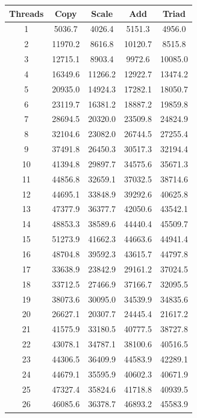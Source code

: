 \documentclass[12pt,a4paper,USenglish]{article}      %
\begin{document}
\begin{table}[!hbtp]
\begin{tabular}{ |c|c|c|c|c| } 
\hline
Threads & Copy & Scale & Add & Triad \\
\hline
1 & 5036.7 & 4026.4 & 5151.3 & 4956.0 \\
\hline
2 & 11970.2 & 8616.8 & 10120.7 & 8515.8 \\
\hline
3 & 12715.1 & 8903.4 & 9972.6 & 10085.0 \\
\hline
4 & 16349.6 & 11266.2 & 12922.7 & 13474.2 \\
\hline
5 & 20935.0 & 14924.3 & 17282.1 & 18050.7 \\
\hline
6 & 23119.7 & 16381.2 & 18887.2 & 19859.8 \\
\hline
7 & 28694.5 & 20320.0 & 23509.8 & 24824.9 \\
\hline
8 & 32104.6 & 23082.0 & 26744.5 & 27255.4 \\
\hline
9 & 37491.8 & 26450.3 & 30517.3 & 32194.4 \\
\hline
10 & 41394.8 & 29897.7 & 34575.6 & 35671.3 \\
\hline
11 & 44856.8 & 32659.1 & 37032.5 & 38714.6 \\
\hline
12 & 44695.1 & 33848.9 & 39292.6 & 40625.8 \\
\hline
13 & 47377.9 & 36377.7 & 42050.6 & 43542.1 \\
\hline
14 & 48853.3 & 38589.6 & 44440.4 & 45509.7 \\
\hline
15 & 51273.9 & 41662.3 & 44663.6 & 44941.4 \\
\hline
16 & 48704.8 & 39592.3 & 43615.7 & 44797.8 \\
\hline
17 & 33638.9 & 23842.9 & 29161.2 & 37024.5 \\
\hline
18 & 33712.5 & 27466.9 & 37166.7 & 32095.5 \\
\hline
19 & 38073.6 & 30095.0 & 34539.9 & 34835.6 \\
\hline
20 & 26627.1 & 20307.7 & 24445.4 & 21617.2 \\
\hline
21 & 41575.9 & 33180.5 & 40777.5 & 38727.8 \\
\hline
22 & 43078.1 & 34787.1 & 38100.6 & 40516.5 \\
\hline
23 & 44306.5 & 36409.9 & 44583.9 & 42289.1 \\
\hline
24 & 44679.1 & 35595.9 & 40602.3 & 40671.9 \\
\hline
25 & 47327.4 & 35824.6 & 41718.8 & 40939.5 \\
\hline
26 & 46085.6 & 36378.7 & 46893.2 & 45583.9 \\

\end{tabular}
\end{table}
\end{document}
